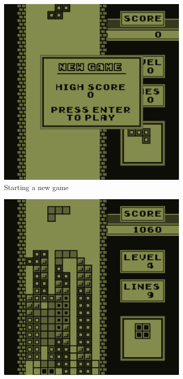 \begin{figure}[H]
    \centering
    \begin{subfigure}[b]{0.45\textwidth}
        \centering
        \includegraphics[width=\textwidth]{Figures/day_5/new_game.png}
        \caption{Starting a new game}
        \label{fig: new game}
    \end{subfigure}
    \hspace{1cm}
    \begin{subfigure}[b]{0.45\textwidth}
        \centering
        \includegraphics[width=\textwidth]{Figures/day_5/game.png}

\end{subfigure}
\end{figure}

